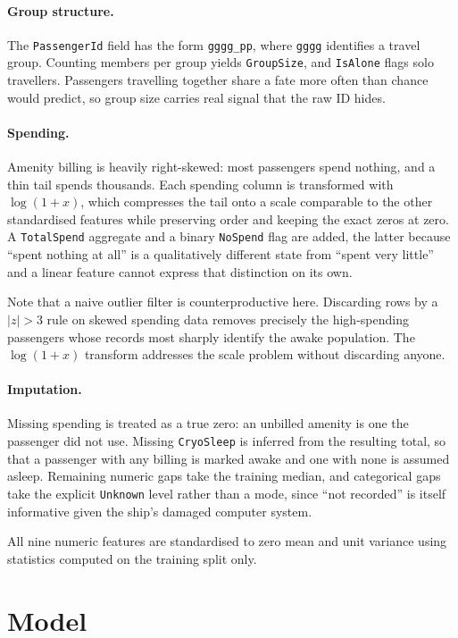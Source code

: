 \documentclass[11pt,a4paper]{article}
\begin{document}
\paragraph{Group structure.} The \texttt{PassengerId} field has the form
\texttt{gggg\_pp}, where \texttt{gggg} identifies a travel group. Counting
members per group yields \texttt{GroupSize}, and \texttt{IsAlone} flags solo
travellers. Passengers travelling together share a fate more often than chance
would predict, so group size carries real signal that the raw ID hides.

\paragraph{Spending.} Amenity billing is heavily right-skewed: most passengers
spend nothing, and a thin tail spends thousands. Each spending column is
transformed with $\log(1+x)$, which compresses the tail onto a scale comparable
to the other standardised features while preserving order and keeping the exact
zeros at zero. A \texttt{TotalSpend} aggregate and a binary \texttt{NoSpend} flag
are added, the latter because ``spent nothing at all'' is a qualitatively
different state from ``spent very little'' and a linear feature cannot express
that distinction on its own.

Note that a naive outlier filter is counterproductive here. Discarding rows by a
$|z| > 3$ rule on skewed spending data removes precisely the high-spending
passengers whose records most sharply identify the awake population. The
$\log(1+x)$ transform addresses the scale problem without discarding anyone.

\paragraph{Imputation.} Missing spending is treated as a true zero: an unbilled
amenity is one the passenger did not use. Missing \texttt{CryoSleep} is inferred
from the resulting total, so that a passenger with any billing is marked awake
and one with none is assumed asleep. Remaining numeric gaps take the training
median, and categorical gaps take the explicit \texttt{Unknown} level rather than
a mode, since ``not recorded'' is itself informative given the ship's damaged
computer system.

All nine numeric features are standardised to zero mean and unit variance using
statistics computed on the training split only.

\section{Model}
\end{document}
